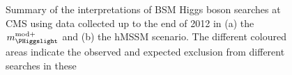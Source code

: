 \begin{figure}[h!]
\begin{center}
\end{center}
\caption[Summary of the interpretations of BSM Higgs boson searches using data up to the end of 2012 at CMS in the $m_{\PHiggslight}^{\text{mod+}}$ scenario and the hMSSM scenario.]{Summary of the interpretations of \ac{BSM} Higgs boson searches at \acs{CMS} using data
collected up to the end of 2012 in (a) the $m_{\PHiggslight}^{\text{mod+}}$ and (b) the
hMSSM scenario. The different coloured areas indicate the observed and expected exclusion from different searches in these
}
\end{figure}

